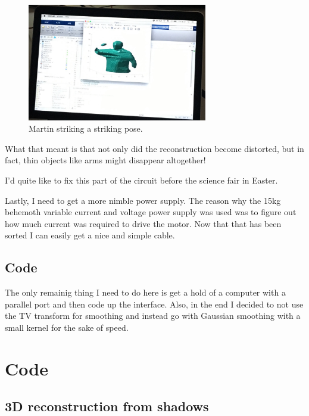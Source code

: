 \documentclass[a4paper]{article}
\begin{document}
\begin{figure}[H]
  \centering
    \includegraphics[width=0.7\textwidth]{figures/martin_recon.jpg}
    \caption{Martin striking a striking pose.}
  \label{fig:f2}
\end{figure}

What that meant is that not only did the reconstruction become distorted, but in fact, thin objects like arms might disappear altogether!

I'd quite like to fix this part of the circuit before the science fair in Easter.

Lastly, I need to get a more nimble power supply. 
The reason why the 15kg behemoth variable current and voltage power supply was used was to figure out how much current was required to drive the motor.
Now that that has been sorted I can easily get a nice and simple cable.

\subsection{Code}
The only remainig thing I need to do here is get a hold of a computer with a parallel port and then code up the interface.
Also, in the end I decided to not use the TV transform for smoothing and instead go with Gaussian smoothing with a small kernel for the sake of speed.

\newpage
\section{Code}
\subsection{3D reconstruction from shadows}
\label{alg:shadow}

\end{document}
